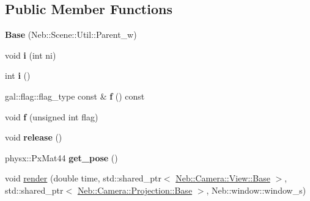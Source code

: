 \subsection*{\-Public \-Member \-Functions}
\begin{DoxyCompactItemize}
\item 
\hypertarget{classNeb_1_1Scene_1_1Base_a3a39fc37c9dbbea3bc331341a9f64be4}{{\bfseries \-Base} (\-Neb\-::\-Scene\-::\-Util\-::\-Parent\-\_\-w)}\label{classNeb_1_1Scene_1_1Base_a3a39fc37c9dbbea3bc331341a9f64be4}

\item 
\hypertarget{classNeb_1_1Scene_1_1Base_a250ec724083495c9aa1388a21e1a2f2d}{void {\bfseries i} (int ni)}\label{classNeb_1_1Scene_1_1Base_a250ec724083495c9aa1388a21e1a2f2d}

\item 
\hypertarget{classNeb_1_1Scene_1_1Base_a6a9930917682770354731d72481de56c}{int {\bfseries i} ()}\label{classNeb_1_1Scene_1_1Base_a6a9930917682770354731d72481de56c}

\item 
\hypertarget{classNeb_1_1Scene_1_1Base_ae775aded1cf90c4ad18207d54f61908c}{gal\-::flag\-::flag\-\_\-type const \& {\bfseries f} () const }\label{classNeb_1_1Scene_1_1Base_ae775aded1cf90c4ad18207d54f61908c}

\item 
\hypertarget{classNeb_1_1Scene_1_1Base_a4a8cad65a1e4fbad347bd47e10462cc5}{void {\bfseries f} (unsigned int flag)}\label{classNeb_1_1Scene_1_1Base_a4a8cad65a1e4fbad347bd47e10462cc5}

\item 
\hypertarget{classNeb_1_1Scene_1_1Base_abd3b47ebbbfa21ad01fa0414ad801ebe}{void {\bfseries release} ()}\label{classNeb_1_1Scene_1_1Base_abd3b47ebbbfa21ad01fa0414ad801ebe}

\item 
\hypertarget{classNeb_1_1Scene_1_1Base_ab1a1720a07c71246df641ac388219aab}{physx\-::\-Px\-Mat44 {\bfseries get\-\_\-pose} ()}\label{classNeb_1_1Scene_1_1Base_ab1a1720a07c71246df641ac388219aab}

\item 
\hypertarget{classNeb_1_1Scene_1_1Base_a3e1b2e85b46edc6a195e2900c82a2df9}{void \hyperlink{classNeb_1_1Scene_1_1Base_a3e1b2e85b46edc6a195e2900c82a2df9}{render} (double time, std\-::shared\-\_\-ptr$<$ \hyperlink{classNeb_1_1Camera_1_1View_1_1Base}{\-Neb\-::\-Camera\-::\-View\-::\-Base} $>$, std\-::shared\-\_\-ptr$<$ \hyperlink{classNeb_1_1Camera_1_1Projection_1_1Base}{\-Neb\-::\-Camera\-::\-Projection\-::\-Base} $>$, \-Neb\-::window\-::window\-\_\-s)}\label{classNeb_1_1Scene_1_1Base_a3e1b2e85b46edc6a195e2900c82a2df9}


\end{DoxyCompactItemize}
